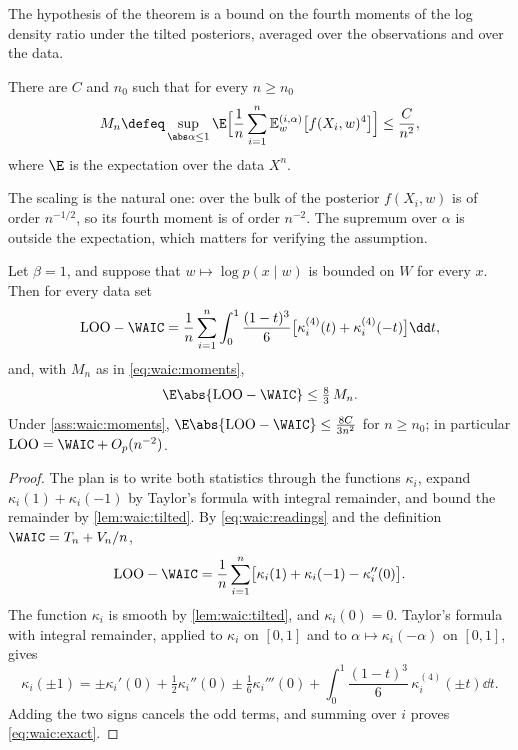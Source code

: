 \begin{refsection}
The hypothesis of the theorem is a bound on the fourth moments of the log density ratio under the tilted posteriors, averaged over the observations and over the data.

\begin{assumption}\label{ass:waic:moments}
There are $C$ and $n_0$ such that for every $n\ge n_0$
\begin{equation}\label{eq:waic:moments}
M_n\defeq\sup_{\abs\alpha\le1}\E\Bigl[\frac1n\sum_{i=1}^n\waicEt{\alpha}{f(X_i,w)^4}\Bigr]\le\frac C{n^2},
\end{equation}
where $\E$ is the expectation over the data $X^n$.
\end{assumption}

The scaling is the natural one: over the bulk of the posterior $f(X_i,w)$ is of order $n^{-1/2}$, so its fourth moment is of order $n^{-2}$. The supremum over $\alpha$ is outside the expectation, which matters for verifying the assumption.

\begin{theorem}[Leave-one-out equals WAIC to order $n^{-2}$; \textcite{Watanabe2010}, Theorem~1 and Corollary~1, at $\beta=1$]\label{thm:waic:loo}
Let $\beta=1$, and suppose that $w\mapsto\log p(x\mid w)$ is bounded on $W$ for every $x$. Then for every data set
\begin{equation}\label{eq:waic:exact}
\waicLOO-\WAIC=\frac1n\sum_{i=1}^n\int_0^1\frac{(1-t)^3}6\bigl[\kappa_i^{(4)}(t)+\kappa_i^{(4)}(-t)\bigr]\dd t,
\end{equation}
and, with $M_n$ as in \eqref{eq:waic:moments},
\[
\E\abs{\waicLOO-\WAIC}\le\tfrac83\,M_n.
\]
Under \cref{ass:waic:moments}, $\E\abs{\waicLOO-\WAIC}\le\frac{8C}{3n^2}$ for $n\ge n_0$; in particular $\waicLOO=\WAIC+O_p(n^{-2})$.
\end{theorem}

\begin{proof}
The plan is to write both statistics through the functions $\kappa_i$, expand $\kappa_i(1)+\kappa_i(-1)$ by Taylor's formula with integral remainder, and bound the remainder by \cref{lem:waic:tilted}. By \eqref{eq:waic:readings} and the definition $\WAIC=T_n+V_n/n$,
\[
\waicLOO-\WAIC=\frac1n\sum_{i=1}^n\bigl[\kappa_i(1)+\kappa_i(-1)-\kappa_i''(0)\bigr].
\]
The function $\kappa_i$ is smooth by \cref{lem:waic:tilted}, and $\kappa_i(0)=0$. Taylor's formula with integral remainder, applied to $\kappa_i$ on $[0,1]$ and to $\alpha\mapsto\kappa_i(-\alpha)$ on $[0,1]$, gives
\[
\kappa_i(\pm1)=\pm\kappa_i'(0)+\tfrac12\kappa_i''(0)\pm\tfrac16\kappa_i'''(0)+\int_0^1\frac{(1-t)^3}6\,\kappa_i^{(4)}(\pm t)\dd t.
\]
Adding the two signs cancels the odd terms, and summing over $i$ proves \eqref{eq:waic:exact}.


\end{proof}
\end{refsection}
